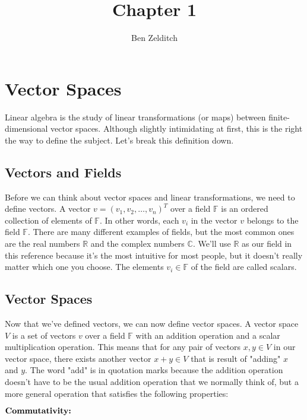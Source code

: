 \documentclass[12pt]{article}
\title{Chapter 1}
\author{Ben Zelditch}
\begin{document}
\maketitle

\section*{Vector Spaces}

Linear algebra is the study of linear transformations (or maps) between finite-dimensional vector spaces. Although slightly intimidating at first, this is the
right the way to define the subject. Let's break this definition down.

\subsection*{Vectors and Fields}

Before we can think about vector spaces and linear transformations, we need to define vectors. A vector $v = (v_1, v_2, \ldots, v_n)^T$ over a field $\mathbb{F}$ is an ordered collection of elements of $\mathbb{F}$. In other words, each $v_i$ in the vector $v$ belongs to the field $\mathbb{F}$. There are many different examples of fields, but the most common ones are the real numbers $\mathbb{R}$ and the complex numbers $\mathbb{C}$. We'll use $\mathbb{R}$ as our field in this reference because it's the most intuitive for most people, but it doesn't really matter which one you choose. The elements $v_i \in \mathbb{F}$ of the field are called scalars.

\subsection*{Vector Spaces}

Now that we've defined vectors, we can now define vector spaces. A vector space $V$ is a set of vectors $v$ over a field $\mathbb{F}$ with an addition operation and a scalar multiplication operation. This means that for any pair of vectors $x, y \in V$ in our vector space, there exists another vector $x + y \in V$ that is result of "adding" $x$ and $y$. The word "add" is in quotation marks because the addition operation doesn't have to be the usual addition operation that we normally think of, but a more general operation that satisfies the following properties:

\vskip 1mm

$\textbf{\textrm{Commutativity:}}$
\end{document}
